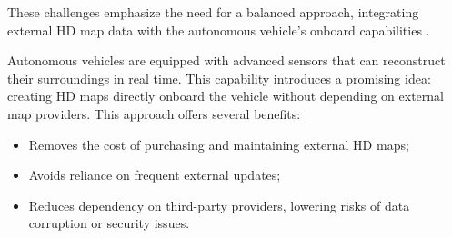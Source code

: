 These challenges emphasize the need for a balanced approach, integrating external HD map data with the autonomous vehicle's onboard capabilities \cite{SEIF2016159, bao2022highdefinitionmapgenerationtechnologies}.

Autonomous vehicles are equipped with advanced sensors that can reconstruct their surroundings in real time. This capability introduces a promising idea: creating HD maps directly onboard the vehicle without depending on external map providers. This approach offers several benefits:
\begin{itemize}
    \item Removes the cost of purchasing and maintaining external HD maps;
    \item Avoids reliance on frequent external updates;
    \item Reduces dependency on third-party providers, lowering risks of data corruption or security issues.
\end{itemize}

